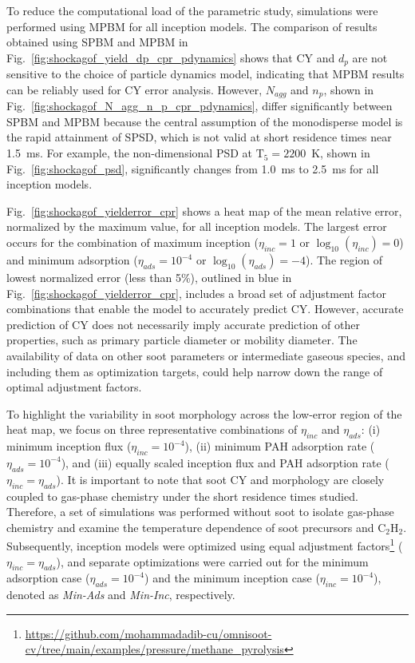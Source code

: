 To reduce the computational load of the parametric study, simulations were performed using MPBM for all inception models. The comparison of results obtained using SPBM and MPBM in Fig.~\ref{fig:shockagof_yield_dp_cpr_pdynamics} shows that CY and $d_p$ are not sensitive to the choice of particle dynamics model, indicating that MPBM results can be reliably used for CY error analysis. However, $N_{agg}$ and $n_p$, shown in Fig.~\ref{fig:shockagof_N_agg_n_p_cpr_pdynamics}, differ significantly between SPBM and MPBM because the central assumption of the monodisperse model is the rapid attainment of SPSD, which is not valid at short residence times near 1.5~ms. For example, the non-dimensional PSD at $\mathrm{T_5}=2200$~K, shown in Fig.~\ref*{fig:shockagof_psd}, significantly changes from 1.0~ms to 2.5~ms for all inception models.

Fig.~\ref{fig:shockagof_yielderror_cpr} shows a heat map of the mean relative error, normalized by the maximum value, for all inception models. The largest error occurs for the combination of maximum inception ($\eta_{inc} = 1$ or $\log_{10}(\eta_{inc}) = 0$) and minimum adsorption ($\eta_{ads} = 10^{-4}$ or $\log_{10}(\eta_{ads}) = -4$). The region of lowest normalized error (less than 5\%), outlined in blue in Fig.~\ref{fig:shockagof_yielderror_cpr}, includes a broad set of adjustment factor combinations that enable the model to accurately predict CY. However, accurate prediction of CY does not necessarily imply accurate prediction of other properties, such as primary particle diameter or mobility diameter. The availability of data on other soot parameters or intermediate gaseous species, and including them as optimization targets, could help narrow down the range of optimal adjustment factors.

To highlight the variability in soot morphology across the low-error region of the heat map, we focus on three representative combinations of $\eta_{inc}$ and $\eta_{ads}$: (i) minimum inception flux ($\eta_{inc} = 10^{-4}$), (ii) minimum PAH adsorption rate ($\eta_{ads} = 10^{-4}$), and (iii) equally scaled inception flux and PAH adsorption rate ($\eta_{inc}= \eta_{ads}$). It is important to note that soot CY and morphology are closely coupled to gas-phase chemistry under the short residence times studied. Therefore, a set of simulations was performed without soot to isolate gas-phase chemistry and examine the temperature dependence of soot precursors and $\mathrm{C_2H_2}$. Subsequently, inception models were optimized using equal adjustment factors\footnote{\href{https://github.com/mohammadadib-cu/omnisoot-cv/tree/main/examples/pressure/methane_pyrolysis}{https://github.com/mohammadadib-cu/omnisoot-cv/tree/main/examples/pressure/methane\_pyrolysis}} ($\eta_{inc} = \eta_{ads}$), and separate optimizations were carried out for the minimum adsorption case ($\eta_{ads} = 10^{-4}$) and the minimum inception case ($\eta_{inc} = 10^{-4}$), denoted as \textit{Min-Ads} and \textit{Min-Inc}, respectively.



